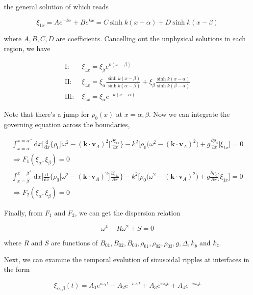 \documentclass[
  notoc %
]{tufte-book}
\begin{document}
the general solution of which reads

\[
\xi_{1x} = Ae^{-kx} + Be^{kx} = C\sinh{k(x-\alpha)} + D\sinh{k(x-\beta)}
\]

where \(A,B,C,D\) are coefficients. Cancelling out the unphysical
solutions in each region, we have

\[
\begin{aligned}
\text{I: }& \xi_{1x} = \xi_\beta e^{k(x-\beta)} \\
\text{II: }& \xi_{1x} = \xi_\alpha \frac{\sinh{k(x-\beta)}}{\sinh{k(\alpha-\beta)}} + \xi_\beta \frac{\sinh{k(x-\alpha)}}{\sinh{k(\beta-\alpha)}} \\
\text{III: }& \xi_{1x} = \xi_\alpha e^{-k(x-\alpha)}
\end{aligned}
\]

Note that there's a jump for \(\rho_0(x)\) at \(x=\alpha,\beta\). Now we
can integrate the governing equation across the boundaries,

\[
\begin{aligned}
\int_{x=\alpha^-}^{x=\alpha^+} \mathrm{d}x \Big[ \frac{\mathrm{d}}{\mathrm{d}x}\Big\{ \rho_0\big[ \omega^2-(\mathbf{k}\cdot\mathbf{v}_A)^2\big] \frac{\partial \xi_{1x}}{\partial x} \Big\}
- k^2 \big[ \rho_0\big( \omega^2 - (\mathbf{k}\cdot\mathbf{v}_A)^2\big)+g\frac{\partial \rho_0}{\partial x}\big] \xi_{1x}  \Big]= 0 \\
\Rightarrow F_1(\xi_\alpha,\xi_\beta) = 0 \\
\int_{x=\beta^-}^{x=\beta^+} \mathrm{d}x \Big[ \frac{\mathrm{d}}{\mathrm{d}x}\Big\{ \rho_0\big[ \omega^2-(\mathbf{k}\cdot\mathbf{v}_A)^2\big] \frac{\partial \xi_{1x}}{\partial x} \Big\}
- k^2 \big[ \rho_0\big( \omega^2 - (\mathbf{k}\cdot\mathbf{v}_A)^2\big)+g\frac{\partial \rho_0}{\partial x}\big] \xi_{1x}  \Big]= 0 \\
\Rightarrow F_2(\xi_\alpha,\xi_\beta) = 0
\end{aligned}
\]

Finally, from \(F_1\) and \(F_2\), we can get the dispersion relation

\[
\omega^4 - R\omega^2  + S = 0
\]

where \(R\) and \(S\) are functions of
\(B_{01},B_{02},B_{03},\rho_{01},\rho_{02},\rho_{03},g,\Delta,k_y\) and
\(k_z\).

Next, we can examine the temporal evolution of sinusoidal ripples at
interfaces in the form

\[
\xi_{\alpha,\beta}(t) = A_1 e^{i\omega_1 t}+A_2 e^{-i\omega_3 t}+A_3e^{i\omega_3 t}  + A_4 e^{-i\omega_3 t}
\]
\end{document}
